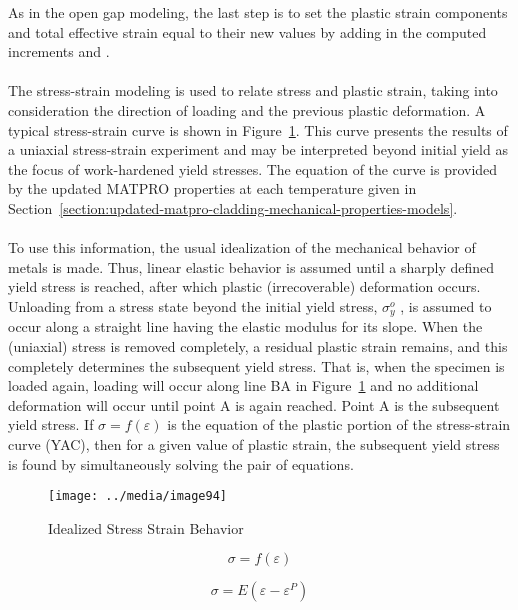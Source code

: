 As in the open gap modeling, the last step is to set the plastic strain components and total
effective strain equal to their new values by adding in the computed increments  and \de{}.
\\
\\
The stress-strain modeling is used to relate stress and plastic strain, taking into consideration
the direction of loading and the previous plastic deformation. A typical stress-strain curve is
shown in Figure~\ref{fig:idealized_stress_strain_behavior}.  This curve presents the results of a
uniaxial stress-strain experiment and may be interpreted beyond initial yield as the focus of
work-hardened yield stresses. The equation of the curve is provided by the updated MATPRO properties
at each temperature given in
Section~\ref{section:updated-matpro-cladding-mechanical-properties-models}.
\\
\\
To use this information, the usual idealization of the mechanical behavior of metals is made. Thus,
linear elastic behavior is assumed until a sharply defined yield stress is reached, after which
plastic (irrecoverable) deformation occurs. Unloading from a stress state beyond the initial yield
stress, $\sigma_{y}^{o}$ , is assumed to occur along a straight line having the elastic modulus for
its slope. When the (uniaxial) stress is removed completely, a residual plastic strain remains, and
this completely determines the subsequent yield stress. That is, when the specimen is loaded again,
loading will occur along line BA in Figure~\ref{fig:idealized_stress_strain_behavior} and no
additional deformation will occur until point A is again reached. Point A is the subsequent yield
stress. If $\sigma =f(\varepsilon)$ is the equation of the plastic portion of the stress-strain
curve (YAC), then for a given value of plastic strain, the subsequent yield stress is found by
simultaneously solving the pair of equations.

\begin{figure}
    \texttt{[image: ../media/image94]}
    \caption{Idealized Stress Strain Behavior}
    \label{fig:idealized_stress_strain_behavior}
\end{figure}

\begin{equation} 
    \label{eq:sigma_f_e}
    \sigma=f\left(\varepsilon\right)
\end{equation} 

\begin{equation} 
    \label{eq:sigma_E_e}
    \sigma=E(\varepsilon-\varepsilon^P)
\end{equation}

